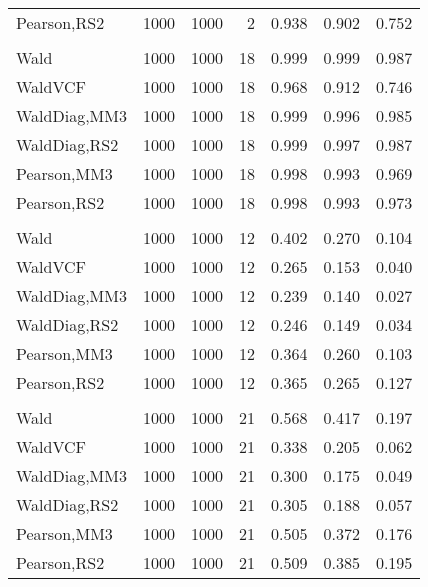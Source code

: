 \documentclass[
]{article}
\begin{document}
\begin{table}[H]
{\begin{tabular}[t]{lrrrrrr}
\hspace{1em}Pearson,RS2 & 1000 & 1000 & 2 & 0.938 & 0.902 & 0.752\\
\addlinespace[0.3em]
\multicolumn{7}{l}{\textbf{1F 15V}}\\
\hspace{1em}Wald & 1000 & 1000 & 18 & 0.999 & 0.999 & 0.987\\
\hspace{1em}WaldVCF & 1000 & 1000 & 18 & 0.968 & 0.912 & 0.746\\
\hspace{1em}WaldDiag,MM3 & 1000 & 1000 & 18 & 0.999 & 0.996 & 0.985\\
\hspace{1em}WaldDiag,RS2 & 1000 & 1000 & 18 & 0.999 & 0.997 & 0.987\\
\hspace{1em}Pearson,MM3 & 1000 & 1000 & 18 & 0.998 & 0.993 & 0.969\\
\hspace{1em}Pearson,RS2 & 1000 & 1000 & 18 & 0.998 & 0.993 & 0.973\\
\addlinespace[0.3em]
\multicolumn{7}{l}{\textbf{2F 10V}}\\
\hspace{1em}Wald & 1000 & 1000 & 12 & 0.402 & 0.270 & 0.104\\
\hspace{1em}WaldVCF & 1000 & 1000 & 12 & 0.265 & 0.153 & 0.040\\
\hspace{1em}WaldDiag,MM3 & 1000 & 1000 & 12 & 0.239 & 0.140 & 0.027\\
\hspace{1em}WaldDiag,RS2 & 1000 & 1000 & 12 & 0.246 & 0.149 & 0.034\\
\hspace{1em}Pearson,MM3 & 1000 & 1000 & 12 & 0.364 & 0.260 & 0.103\\
\hspace{1em}Pearson,RS2 & 1000 & 1000 & 12 & 0.365 & 0.265 & 0.127\\
\addlinespace[0.3em]
\multicolumn{7}{l}{\textbf{3F 15V}}\\
\hspace{1em}Wald & 1000 & 1000 & 21 & 0.568 & 0.417 & 0.197\\
\hspace{1em}WaldVCF & 1000 & 1000 & 21 & 0.338 & 0.205 & 0.062\\
\hspace{1em}WaldDiag,MM3 & 1000 & 1000 & 21 & 0.300 & 0.175 & 0.049\\
\hspace{1em}WaldDiag,RS2 & 1000 & 1000 & 21 & 0.305 & 0.188 & 0.057\\
\hspace{1em}Pearson,MM3 & 1000 & 1000 & 21 & 0.505 & 0.372 & 0.176\\
\hspace{1em}Pearson,RS2 & 1000 & 1000 & 21 & 0.509 & 0.385 & 0.195\\
\bottomrule
\end{tabular}}
\endgroup{}
\end{table}
\end{document}
